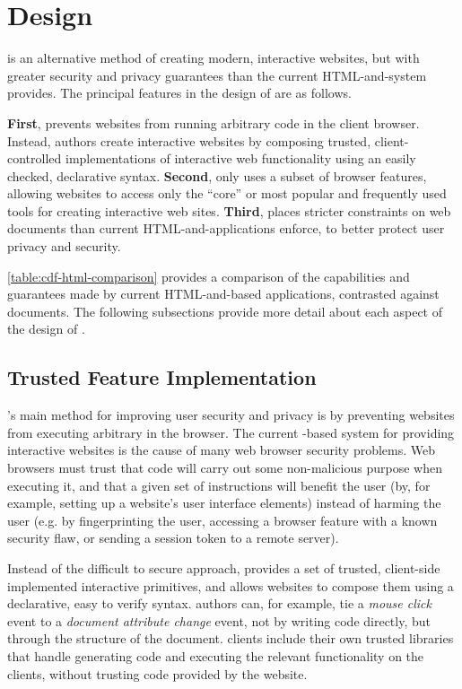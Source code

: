 \section{Design}
\label{future-web:design}

\CDF is an alternative method of creating modern, interactive websites, but with greater security and
privacy guarantees than the current HTML-and-\JS system provides.  The principal
features in the design of \CDF are as follows.

\textbf{First}, \CDF prevents websites from running arbitrary code in the client browser.
Instead, \CDF authors create interactive websites by
composing trusted, client-controlled implementations of interactive web functionality
using an easily checked, declarative syntax.
\textbf{Second}, \CDF only uses a subset of browser features, allowing websites
to access only the ``core'' or most popular and frequently used tools for
creating interactive web sites.
\textbf{Third}, \CDF places stricter constraints on web documents than current
HTML-and-\JS applications enforce,
to better protect user privacy and security.



\ref{table:cdf-html-comparison} provides a comparison of the capabilities
and guarantees made by current HTML-and-\JS based applications, contrasted
against \CDF documents.  The following subsections provide more detail
about each aspect of the design of \CDF.


\subsection{Trusted Feature Implementation}
\label{future-web:design:trusted-feature-implementation}
\CDF's main method for improving user security and privacy is by preventing websites from
executing arbitrary \JS in the browser.  The current
\JS-based system for providing interactive websites is the cause
of many web browser security problems.  Web browsers must trust that code
will carry out some non-malicious purpose when executing it, and that a given
set of \JS instructions will benefit the user (by, for example, setting up
a website's user interface elements) instead of harming the user (e.g. by fingerprinting
the user, accessing a browser feature with a known security flaw, or sending
a session token to a remote server).

Instead of the difficult to secure \JS approach, \CDF provides a set of
trusted, client-side implemented interactive primitives, and allows websites
to compose them using a declarative, easy to verify syntax.  \CDF authors can,
for example, tie a \emph{mouse click} event to a \emph{document attribute
change} event, not by writing code directly, but through the structure of the
document.  \CDF clients include their own trusted libraries that handle
generating code and executing the relevant functionality on the clients, without
trusting code provided by the website.

